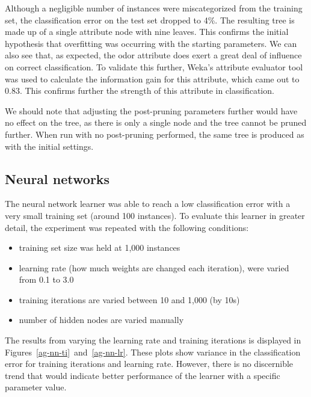 \documentclass{sig-alternate}
\begin{document}
Although a negligible number of instances were miscategorized from the training set, the classification error on the test set dropped to 4\%. The resulting tree is made up of a single attribute node with nine leaves. This confirms the initial hypothesis that overfitting was occurring with the starting parameters. We can also see that, as expected, the odor attribute does exert a great deal of influence on correct classification. To validate this further, Weka's attribute evaluator tool was used to calculate the information gain for this attribute, which came out to 0.83. This confirms further the strength of this attribute in classification.

We should note that adjusting the post-pruning parameters further would have no effect on the tree, as there is only a single node and the tree cannot be pruned further. When run with no post-pruning performed, the same tree is produced as with the initial settings.



\subsection{Neural networks}

The neural network learner was able to reach a low classification error with a very small training set (around 100 instances). To evaluate this learner in greater detail, the experiment was repeated with the following conditions:

\begin{itemize}
    \item training set size was held at 1,000 instances
    \item learning rate (how much weights are changed each iteration), were varied from 0.1 to 3.0
    \item training iterations are varied between 10 and 1,000 (by 10s)
    \item number of hidden nodes are varied manually
\end{itemize}

The results from varying the learning rate and training iterations is displayed in Figures~\ref{ag-nn-ti}~and~\ref{ag-nn-lr}. These plots show variance in the classification error for training iterations and learning rate. However, there is no discernible trend that would indicate better performance of the learner with a specific parameter value.
\end{document}
